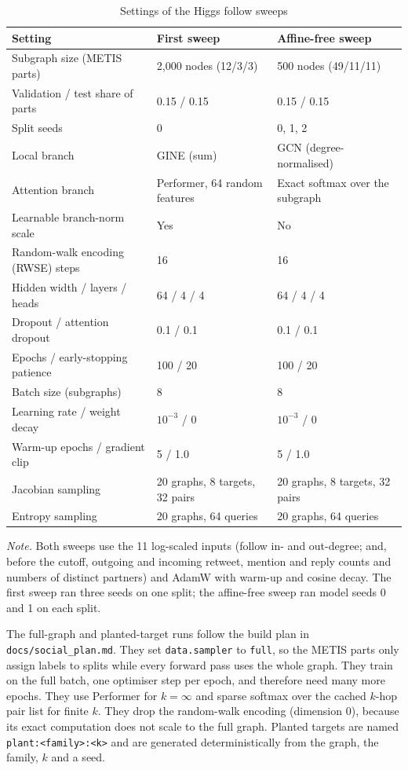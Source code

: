 \begin{table}[H]
\caption{Settings of the Higgs follow sweeps}
\label{tab:socialconfig}
\centering\small
\begin{tabular}{@{}L{2.1in}L{1.75in}L{1.75in}@{}}
\toprule
Setting & First sweep & Affine-free sweep \\
\midrule
Subgraph size (METIS parts) & 2,000 nodes (12/3/3) & 500 nodes (49/11/11) \\
Validation / test share of parts & 0.15 / 0.15 & 0.15 / 0.15 \\
Split seeds & 0 & 0, 1, 2 \\
Local branch & GINE (sum) & GCN (degree-normalised) \\
Attention branch & Performer, 64 random features & Exact softmax over the subgraph \\
Learnable branch-norm scale & Yes & No \\
Random-walk encoding (RWSE) steps & 16 & 16 \\
Hidden width / layers / heads & 64 / 4 / 4 & 64 / 4 / 4 \\
Dropout / attention dropout & 0.1 / 0.1 & 0.1 / 0.1 \\
Epochs / early-stopping patience & 100 / 20 & 100 / 20 \\
Batch size (subgraphs) & 8 & 8 \\
Learning rate / weight decay & $10^{-3}$ / 0 & $10^{-3}$ / 0 \\
Warm-up epochs / gradient clip & 5 / 1.0 & 5 / 1.0 \\
Jacobian sampling & 20 graphs, 8 targets, 32 pairs & 20 graphs, 8 targets, 32 pairs \\
Entropy sampling & 20 graphs, 64 queries & 20 graphs, 64 queries \\
\bottomrule
\end{tabular}

\vspace{4pt}
\parbox{0.9\textwidth}{\footnotesize\textit{Note.} Both sweeps use the 11 log-scaled inputs (follow in- and out-degree; and, before the cutoff, outgoing and incoming retweet, mention and reply counts and numbers of distinct partners) and AdamW with warm-up and cosine decay. The first sweep ran three seeds on one split; the affine-free sweep ran model seeds 0 and 1 on each split.}
\end{table}

The full-graph and planted-target runs follow the build plan in \nolinkurl{docs/social_plan.md}. They set \texttt{data.sampler} to \texttt{full}, so the METIS parts only assign labels to splits while every forward pass uses the whole graph. They train on the full batch, one optimiser step per epoch, and therefore need many more epochs. They use Performer for $k=\infty$ and sparse softmax over the cached $k$-hop pair list for finite $k$. They drop the random-walk encoding (dimension 0), because its exact computation does not scale to the full graph. Planted targets are named \texttt{plant:<family>:<k>} and are generated deterministically from the graph, the family, $k$ and a seed. 
